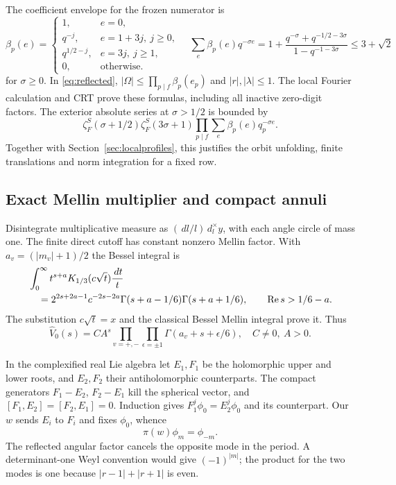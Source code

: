 \documentclass[11pt,a4paper]{article}
\numberwithin{equation}{section}
\theoremstyle{definition}
\theoremstyle{remark}
\newcommand{\dd}{\,d}
\newcommand{\Rea}{\operatorname{Re}}
\newcommand{\wt}{\widehat}
\begin{document}
The coefficient envelope for the frozen numerator is
\begin{equation}\label{eq:beta}
 \beta_p(e)=
 \begin{cases}
 1,&e=0,\\
 q^{-j},&e=1+3j,\ j\ge0,\\
 q^{1/2-j},&e=3j,\ j\ge1,\\
 0,&\text{otherwise}.
 \end{cases}
 \quad
 \sum_e\beta_p(e)q^{-\sigma e}
 =1+\frac{q^{-\sigma}+q^{-1/2-3\sigma}}{1-q^{-1-3\sigma}}
 \le3+\sqrt2
\end{equation}
for $\sigma\ge0$. In \eqref{eq:reflected}, $|\Omega|\le\prod_{p\mid f}\beta_p(e_p)$ and $|r|,|\lambda|\le1$. The local Fourier calculation and CRT prove these formulas, including all inactive zero-digit factors. The exterior absolute series at $\sigma>1/2$ is bounded by
\[
 \zeta_F^S(\sigma+1/2)\zeta_F^S(3\sigma+1)
              \prod_{p\mid f}\sum_e\beta_p(e)q_p^{-\sigma e}.
\]
Together with Section~\ref{sec:localprofiles}, this justifies the orbit unfolding, finite translations and norm integration for a fixed row.

\subsection{Exact Mellin multiplier and compact annuli}\label{sec:annular}
Disintegrate multiplicative measure as $(\dd l/l)\dd_l^\times y$, with each angle circle of mass one. The finite direct cutoff has constant nonzero Mellin factor. With $a_v=(|m_v|+1)/2$ the Bessel integral is
\begin{align}\label{eq:besselmellin}
 &\int_0^\infty t^{s+a}K_{1/3}(c\sqrt t)\frac{\dd t}{t}\notag\\
 &\quad=2^{2s+2a-1}c^{-2s-2a}
                  \Gamma(s+a-1/6)\Gamma(s+a+1/6),
 \qquad\Rea s>1/6-a.
\end{align}
The substitution $c\sqrt t=x$ and the classical Bessel Mellin integral \cite[10.43.19]{DLMF} prove it. Thus
\[
 \wt V_0(s)=CA^s\prod_{v=+,-}\prod_{\epsilon=\pm1}
                         \Gamma(a_v+s+\epsilon/6),\quad C\ne0,\ A>0.
\]

In the complexified real Lie algebra let $E_1,F_1$ be the holomorphic upper and lower roots, and $E_2,F_2$ their antiholomorphic counterparts. The compact generators $F_1-E_2$, $F_2-E_1$ kill the spherical vector, and $[F_1,E_2]=[F_2,E_1]=0$. Induction gives $F_1^j\phi_0=E_2^j\phi_0$ and its counterpart. Our $w$ sends $E_i$ to $F_i$ and fixes $\phi_0$, whence
\[
 \pi(w)\phi_m=\phi_{-m}.
\]
The reflected angular factor cancels the opposite mode in the period. A determinant-one Weyl convention would give $(-1)^{|m|}$; the product for the two modes is one because $|r-1|+|r+1|$ is even.
\end{document}
